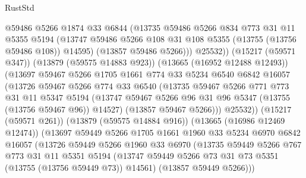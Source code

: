 \begin{lexlean}{RustStd}
\begin{coremodule}
                      @59486
                      @5266
                      @1874
                      @33
                      @6844
                      (@13735
                        @59486
                        @5266
                        @834
                        @773
                        @31
                        @11
                        @5355
                        @5194
                        (@13747
                          @59486
                          @5266
                          @108
                          @31
                          @108
                          @5355
                          (@13755 (@13756 @59486 @108))
                          @14595)
                        (@13857 @59486 @5266)))
                    @25532))
                (@15217 (@59571 @347))
                (@13879 (@59575 @14883 @923))
                (@13665 (@16952 @12488 @12493))
                (@13697
                  @59467
                  @5266
                  @1705
                  @1661
                  @774
                  @33
                  @5234
                  @6540
                  @6842
                  @16057
                  (@13726
                    @59467
                    @5266
                    @774
                    @33
                    @6540
                    (@13735
                      @59467
                      @5266
                      @771
                      @773
                      @31
                      @11
                      @5347
                      @5194
                      (@13747 @59467 @5266 @96 @31 @96 @5347 (@13755 (@13756 @59467 @96)) @14527)
                      (@13857 @59467 @5266)))
                  @25532))
              (@15217 (@59571 @261))
              (@13879 (@59575 @14884 @916))
              (@13665 (@16986 @12469 @12474))
              (@13697
                @59449
                @5266
                @1705
                @1661
                @1960
                @33
                @5234
                @6970
                @6842
                @16057
                (@13726
                  @59449
                  @5266
                  @1960
                  @33
                  @6970
                  (@13735
                    @59449
                    @5266
                    @767
                    @773
                    @31
                    @11
                    @5351
                    @5194
                    (@13747 @59449 @5266 @73 @31 @73 @5351 (@13755 (@13756 @59449 @73)) @14561)
                    (@13857 @59449 @5266)))

\end{coremodule}
\end{lexlean}

